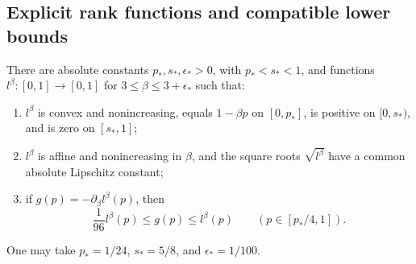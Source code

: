 \subsection{Explicit rank functions and compatible lower bounds}

\begin{lemma}\label{lem:rank-functions}
There are absolute constants $p_*,s_*,\epsilon_*>0$, with $p_*<s_*<1$,
and functions $l^\beta:[0,1]\to[0,1]$ for
$3\le\beta\le3+\epsilon_*$ such that:
\begin{enumerate}
\item $l^\beta$ is convex and nonincreasing, equals $1-\beta p$ on
      $[0,p_*]$, is positive on $[0,s_*)$, and is zero on $[s_*,1]$;
\item $l^\beta$ is affine and nonincreasing in $\beta$, and the square
      roots $\sqrt{l^\beta}$ have a common absolute Lipschitz constant;
\item if $g(p)=-\partial_\beta l^\beta(p)$, then
\begin{equation}\label{eq:rank-derivative}
 \frac1{96}l^\beta(p)\le g(p)\le l^\beta(p)
       \qquad(p\in[p_*/4,1]).
\end{equation}
\end{enumerate}
One may take $p_*=1/24$, $s_*=5/8$, and $\epsilon_*=1/100$.
\end{lemma}

